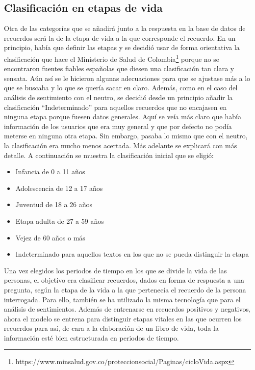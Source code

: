 \subsection{Clasificación en etapas de vida} \label{clasificacion_etapasvida}

Otra de las categorías que se añadirá junto a la respuesta en la base de datos de recuerdos será la de la etapa de vida a la que corresponde el recuerdo. En un principio, había que definir las etapas y se decidió usar de forma orientativa la clasificación que hace el Ministerio de Salud de Colombia\footnote{https://www.minsalud.gov.co/proteccionsocial/Paginas/cicloVida.aspx} porque no se encontraron fuentes fiables españolas que diesen una clasificación tan clara y sensata. Aún así se le hicieron algunas adecuaciones para que se ajustase más a lo que se buscaba y lo que se quería sacar en claro. Además, como en el caso del análisis de sentimiento con el neutro, se decidió desde un principio añadir la clasificación ``Indeterminado'' para aquellos recuerdos que no encajasen en ninguna etapa porque fuesen datos generales. Aquí se veía más claro que había información de los usuarios que era muy general y que por defecto no podía meterse en ninguna otra etapa. Sin embargo, pasaba lo mismo que con el neutro, la clasificación era mucho menos acertada. Más adelante se explicará con más detalle. A continuación se muestra la clasificación inicial que se eligió:

\begin{itemize}
	\item Infancia de 0 a 11 años
	\item Adolescencia de 12 a 17 años
	\item Juventud de 18 a 26 años
	\item Etapa adulta de 27 a 59 años
	\item Vejez de 60 años o más
	\item Indeterminado para aquellos textos en los que no se pueda distinguir la etapa
\end{itemize}

Una vez elegidos los periodos de tiempo en los que se divide la vida de las personas, el objetivo era clasificar recuerdos, dados en forma de respuesta a una pregunta, según la etapa de la vida a la que pertenecía el recuerdo de la persona interrogada. Para ello, también se ha utilizado la misma tecnología que para el análisis de sentimientos. Además de entrenarse en recuerdos positivos y negativos, ahora el modelo se entrena para distinguir etapas vitales en las que ocurren los recuerdos para así, de cara a la elaboración de un libro de vida, toda la información esté bien estructurada en periodos de tiempo. 

